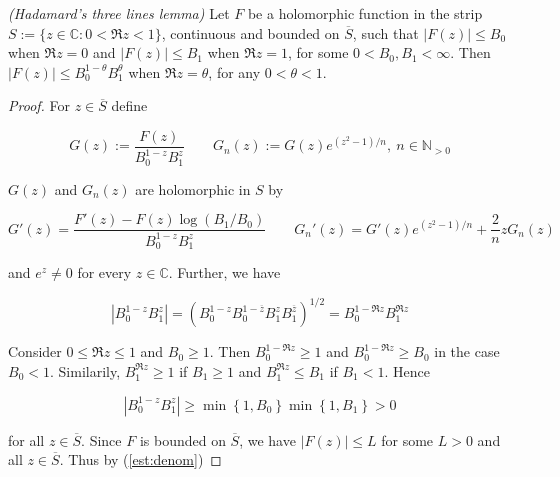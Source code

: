 \begin{mdframed}
	\begin{lemma}\emph{(Hadamard's three lines lemma)}
		Let $F$ be a holomorphic function in the strip $S := \{z \in \mathbb{C}: 0 < \Re z < 1\}$, continuous and bounded on $\overline{S}$, such that $\left| F(z)\right| \leqslant B_0$ when $\Re z = 0$ and $\left| F(z) \right| \leqslant B_1$ when $\Re z = 1$, for some $0 < B_0,B_1 < \infty$. Then $\left| F(z) \right| \leqslant B_0^{1 - \theta}B_1^\theta$ when $\Re z = \theta$, for any $0 < \theta < 1$.
	\end{lemma}
\end{mdframed}

\begin{proof}
For $z \in \overline{S}$ define 

\begin{equation*}
	G(z) := \frac{F(z)}{B_0^{1 - z}B_1^z} \qquad G_n(z) := G(z) e^{\left(z^2 - 1\right)/n},~n \in\mathbb{N}_{>0}
\end{equation*}

$G(z)$ and $G_n(z)$ are holomorphic in $S$ by
	
\begin{equation*}
	G'(z) = \frac{F'(z) - F(z)\log\left( B_1/B_0 \right)}{B_0^{1 - z}B_1^z} \qquad G_n'(z) = G'(z)e^{\left( z^2 - 1 \right)/n} + \frac{2}{n}zG_n(z)	
\end{equation*}

and $e^z \neq 0$ for every $z \in \mathbb{C}$. Further, we have

\begin{equation*}
		\left| B_0^{1 - z}B_1^z \right| = \left(B_0^{1 - z}B_0^{1 - \overline{z}} B_1^z B_1^{\overline{z}}\right)^{1/2} =  B_0^{1 -\Re z}B_1^{\Re z}
\end{equation*}

Consider $0 \leqslant \Re z \leqslant 1$ and $B_0 \geqslant 1$. Then $B_0^{1 - \Re z} \geqslant 1$ and $B_0^{1 - \Re z } \geqslant B_0$ in the case $B_0 < 1$. Similarily, $B_1^{\Re z} \geqslant 1$ if $B_1 \geqslant 1$ and $B_1^{\Re z} \leqslant B_1$ if $B_1 < 1$. Hence 

\begin{equation}
	\left| B_0^{1 - z}B_1^z \right| \geqslant \min\left\{1,B_0\right\}\min\left\{1,B_1\right\} > 0
	\label{est:denom}
\end{equation}

for all $z \in \overline{S}$. Since $F$ is bounded on $\overline{S}$, we have $\left| F(z) \right| \leqslant L$ for some $L > 0$ and all $z \in \overline{S}$. Thus by (\ref{est:denom})


\end{proof}
